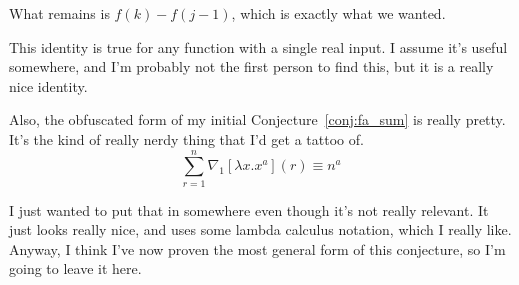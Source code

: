 \documentclass[a4paper]{article}
\newcommand{\sn}{\sum\limits_{r=1}^{n}}
\begin{document}
What remains is $f(k) - f(j-1)$, which is exactly what we wanted.

This identity is true for any function with a single real input. I assume it's useful somewhere, and I'm probably not the first person to find this, but it is a really nice identity.

Also, the obfuscated form of my initial Conjecture~\ref{conj:fa_sum} is really pretty. It's the kind of really nerdy thing that I'd get a tattoo of. $$\sn \nabla_1[\lambda x.x^a](r) \equiv n^a$$

I just wanted to put that in somewhere even though it's not really relevant. It just looks really nice, and uses some lambda calculus\cite{wikipedia-lambda-calculus} notation, which I really like. Anyway, I think I've now proven the most general form of this conjecture, so I'm going to leave it here.

\printbibliography
\end{document}
